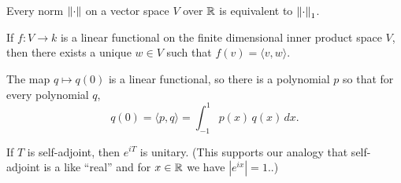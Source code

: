 \documentclass{homework}
\begin{document}
\begin{problem}\label{equivalence-of-norms}Every norm $\left\lVert\cdot\right\rVert$ on a vector space $V$ over $\mathbb{R}$ is equivalent to $\left\lVert\cdot\right\rVert_1$.
\end{problem}%

\begin{problem}
  If $f : V \to k$ is a linear functional on the finite dimensional inner product space $V$, then there exists a unique $w \in V$ such that $f(v) = \langle v, w \rangle$.
\end{problem}

\begin{problem}
  The map $q \mapsto q(0)$ is a linear functional, so there is a
  polynomial $p$ so that for every polynomial $q$,
  \[
    q(0) = \langle p, q \rangle = \int_{-1}^1 p(x) \, q(x) \, dx.
  \]
\end{problem}%

\begin{problem}
If $T$ is self-adjoint, then $e^{iT}$ is unitary.  (This supports our analogy that self-adjoint is a like ``real'' and for $x \in \mathbb{R}$ we have $|e^{ix}| = 1$..) 
\end{problem}
\end{document}
